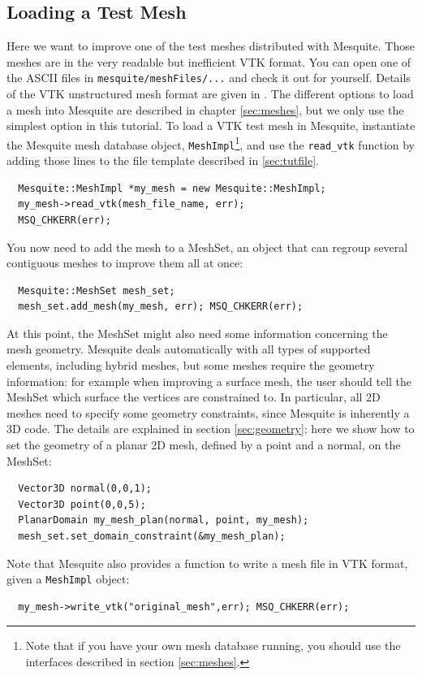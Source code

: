 \documentclass[letter]{report}
\begin{document}
\subsection{Loading a Test Mesh}
\label{sec:tutMesh}
Here we want to improve one of the test meshes distributed with Mesquite. Those meshes are in
the very readable but inefficient VTK format. You can open one of the ASCII files in
\texttt{mesquite/meshFiles/...} and check it out for yourself. Details of the VTK unstructured mesh 
format are given in \cite{VTKbook, VTKuml}. The different options to load a mesh into Mesquite are 
described in chapter \ref{sec:meshes}, but we only use the simplest option in this tutorial.
To load a VTK test mesh in Mesquite, instantiate the Mesquite mesh database object,
\texttt{MeshImpl}\footnote{Note that if you have your own mesh
database running, you should use the interfaces described in section \ref{sec:meshes}.}, 
and use the \texttt{read\_vtk} function by adding those lines to the file
template described in \ref{sec:tutfile}.
\begin{verbatim}
  Mesquite::MeshImpl *my_mesh = new Mesquite::MeshImpl;
  my_mesh->read_vtk(mesh_file_name, err); 
  MSQ_CHKERR(err);
\end{verbatim}
You now need to add the mesh to a MeshSet, an object that can regroup several contiguous meshes to
improve them all at once:
\begin{verbatim}
  Mesquite::MeshSet mesh_set;
  mesh_set.add_mesh(my_mesh, err); MSQ_CHKERR(err);
\end{verbatim}
At this point, the MeshSet might also need some information concerning the mesh geometry. Mesquite
deals automatically with all types of supported elements, including hybrid meshes, but some meshes
require the geometry information: for example when improving a surface mesh, the user should tell
the MeshSet which surface the vertices are constrained to. In particular, all 2D meshes need to
specify some geometry constraints, since Mesquite is inherently a 3D code. 
The details are explained in section
\ref{sec:geometry}; here we show how to set the geometry of a planar 2D mesh, defined by a point and
a normal, on the MeshSet: 
\begin{verbatim}
  Vector3D normal(0,0,1);
  Vector3D point(0,0,5);
  PlanarDomain my_mesh_plan(normal, point, my_mesh);
  mesh_set.set_domain_constraint(&my_mesh_plan);
\end{verbatim}

Note that Mesquite also provides a function to write a mesh file in VTK format, given a \texttt{MeshImpl}
object: 
\begin{verbatim}
  my_mesh->write_vtk("original_mesh",err); MSQ_CHKERR(err);
\end{verbatim}
\end{document}
